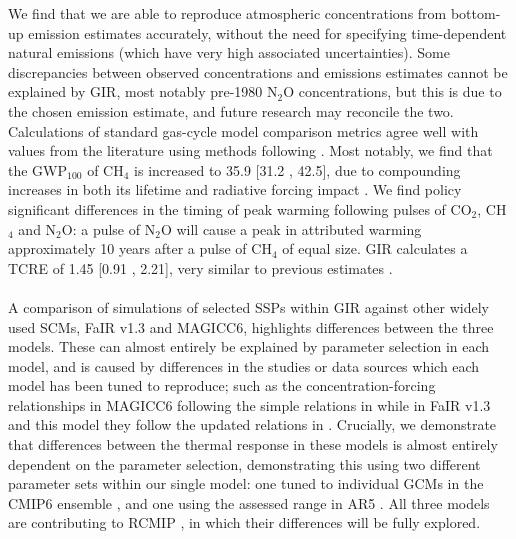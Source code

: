 \documentclass[gmd, manuscript]{copernicus}
\begin{document}
We find that we are able to reproduce atmospheric concentrations from bottom-up emission estimates accurately, without the need for specifying time-dependent natural emissions (which have very high associated uncertainties). Some discrepancies between observed concentrations and emissions estimates cannot be explained by GIR, most notably pre-1980 N$_2$O concentrations, but this is due to the chosen emission estimate, and future research may reconcile the two. Calculations of standard gas-cycle model comparison metrics agree well with values from the literature using methods following \cite{Joos2013}. Most notably, we find that the GWP$_{100}$ of CH$_4$ is increased to 35.9 [31.2 , 42.5], due to compounding increases in both its lifetime and radiative forcing impact \citep{Etminan2016,Holmes2013}. We find policy significant differences in the timing of peak warming following pulses of CO$_2$, CH$_4$ and N$_2$O: a pulse of N$_2$O will cause a peak in attributed warming approximately 10 years after a pulse of CH$_4$ of equal size. GIR calculates a TCRE of 1.45 [0.91 , 2.21], very similar to previous estimates \citep{Millar20160449}.\\\\
A comparison of simulations of selected SSPs within GIR against other widely used SCMs, FaIR v1.3 and MAGICC6, highlights differences between the three models. These can almost entirely be explained by parameter selection in each model, and is caused by differences in the studies or data sources which each model has been tuned to reproduce; such as the concentration-forcing relationships in MAGICC6 following the simple relations in \cite{Myhre2013a} while in FaIR v1.3 and this model they follow the updated relations in \cite{Etminan2016}. Crucially, we demonstrate that differences between the thermal response in these models is almost entirely dependent on the parameter selection, demonstrating this using two different parameter sets within our single model: one tuned to individual GCMs in the CMIP6 ensemble \citep{Tsutsui2017}, and one using the assessed range in AR5 \citep{Collins2013}. All three models are contributing to RCMIP \cite{Nicholls2019}, in which their differences will be fully explored.\\\\
\end{document}
